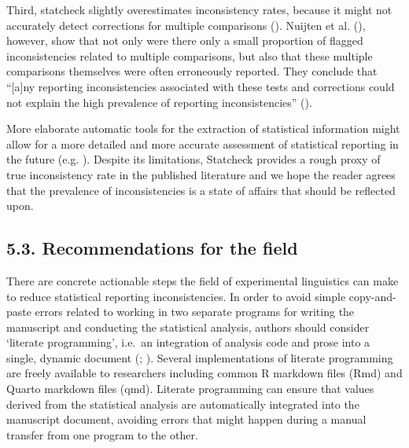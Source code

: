 \documentclass[
  doc,
  longtable,
  nolmodern,
  notxfonts,
  notimes,
  colorlinks=true,linkcolor=blue,citecolor=blue,urlcolor=blue]{apa7}
\begin{document}
Third, statcheck slightly overestimates inconsistency rates, because it
might not accurately detect corrections for multiple comparisons
(). Nuijten et al.
(), however, show that not only
were there only a small proportion of flagged inconsistencies related to
multiple comparisons, but also that these multiple comparisons
themselves were often erroneously reported. They conclude that
``{[}a{]}ny reporting inconsistencies associated with these tests and
corrections could not explain the high prevalence of reporting
inconsistencies'' ().

More elaborate automatic tools for the extraction of statistical
information might allow for a more detailed and more accurate assessment
of statistical reporting in the future (e.g.
). Despite its
limitations, Statcheck provides a rough proxy of true inconsistency rate
in the published literature and we hope the reader agrees that the
prevalence of inconsistencies is a state of affairs that should be
reflected upon.

\subsection{5.3. Recommendations for the
field}\label{recommendations-for-the-field}

There are concrete actionable steps the field of experimental
linguistics can make to reduce statistical reporting inconsistencies. In
order to avoid simple copy-and-paste errors related to working in two
separate programs for writing the manuscript and conducting the
statistical analysis, authors should consider `literate programming',
i.e.~an integration of analysis code and prose into a single, dynamic
document (;
). Several implementations
of literate programming are freely available to researchers including
common R markdown files (Rmd) and Quarto markdown files (qmd). Literate
programming can ensure that values derived from the statistical analysis
are automatically integrated into the manuscript document, avoiding
errors that might happen during a manual transfer from one program to
the other.
\end{document}
